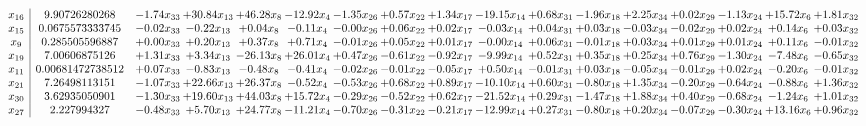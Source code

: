 \documentclass[9pt]{article}
\begin{document}
 \[\begin{array}{c| c c@{\hskip 2pt} c@{\hskip 2pt} c@{\hskip 2pt} c@{\hskip 2pt} c@{\hskip 2pt} c@{\hskip 2pt} c@{\hskip 2pt} c@{\hskip 2pt} c@{\hskip 2pt} c@{\hskip 2pt} c@{\hskip 2pt} c@{\hskip 2pt} c@{\hskip 2pt} c@{\hskip 2pt} c@{\hskip 2pt} }
 x_{16}   &  9.90726280268 & -1.74 x_{33} & + 30.84 x_{13} & + 46.28 x_{8} & -12.92 x_{4} & -1.35 x_{26} & +  0.57 x_{22} & +  1.34 x_{17} & -19.15 x_{14} & +  0.68 x_{31} & -1.96 x_{18} & +  2.25 x_{34} & +  0.02 x_{29} & -1.13 x_{24} & + 15.72 x_{6} & +  1.81 x_{32}\\
 x_{15}   &  0.0675573333745 & -0.02 x_{33} & -0.22 x_{13} & +  0.04 x_{8} & -0.11 x_{4} & -0.00 x_{26} & +  0.06 x_{22} & +  0.02 x_{17} & -0.03 x_{14} & +  0.04 x_{31} & +  0.03 x_{18} & -0.03 x_{34} & -0.02 x_{29} & +  0.02 x_{24} & +  0.14 x_{6} & +  0.03 x_{32}\\
 x_{9}   &  0.285505596887 & +  0.00 x_{33} & +  0.20 x_{13} & +  0.37 x_{8} & +  0.71 x_{4} & -0.01 x_{26} & +  0.05 x_{22} & +  0.01 x_{17} & -0.00 x_{14} & +  0.06 x_{31} & -0.01 x_{18} & +  0.03 x_{34} & +  0.01 x_{29} & +  0.01 x_{24} & +  0.11 x_{6} & -0.01 x_{32}\\
 x_{19}   &  7.00606875126 & +  1.31 x_{33} & +  3.34 x_{13} & -26.13 x_{8} & + 26.01 x_{4} & +  0.47 x_{26} & -0.61 x_{22} & -0.92 x_{17} & -9.99 x_{14} & +  0.52 x_{31} & +  0.35 x_{18} & +  0.25 x_{34} & +  0.76 x_{29} & -1.30 x_{24} & -7.48 x_{6} & -0.65 x_{32}\\
 x_{11}   &  0.00681472738512 & +  0.07 x_{33} & -0.83 x_{13} & -0.48 x_{8} & -0.41 x_{4} & -0.02 x_{26} & -0.01 x_{22} & -0.05 x_{17} & +  0.50 x_{14} & -0.01 x_{31} & +  0.03 x_{18} & -0.05 x_{34} & -0.01 x_{29} & +  0.02 x_{24} & -0.20 x_{6} & -0.01 x_{32}\\
 x_{21}   &  7.26498113151 & -1.07 x_{33} & + 22.66 x_{13} & + 26.37 x_{8} & -0.52 x_{4} & -0.53 x_{26} & +  0.68 x_{22} & +  0.89 x_{17} & -10.10 x_{14} & +  0.60 x_{31} & -0.80 x_{18} & +  1.35 x_{34} & -0.20 x_{29} & -0.64 x_{24} & -0.88 x_{6} & +  1.36 x_{32}\\
 x_{30}   &  3.62935050901 & -1.30 x_{33} & + 19.60 x_{13} & + 44.03 x_{8} & + 15.72 x_{4} & -0.29 x_{26} & -0.52 x_{22} & +  0.62 x_{17} & -21.52 x_{14} & +  0.29 x_{31} & -1.47 x_{18} & +  1.88 x_{34} & +  0.40 x_{29} & -0.68 x_{24} & -1.24 x_{6} & +  1.01 x_{32}\\
 x_{27}   &  2.227994327 & -0.48 x_{33} & +  5.70 x_{13} & + 24.77 x_{8} & -11.21 x_{4} & -0.70 x_{26} & -0.31 x_{22} & -0.21 x_{17} & -12.99 x_{14} & +  0.27 x_{31} & -0.80 x_{18} & +  0.20 x_{34} & -0.07 x_{29} & -0.30 x_{24} & + 13.16 x_{6} & +  0.96 x_{32}\\

\end{array}\]
\end{document}
